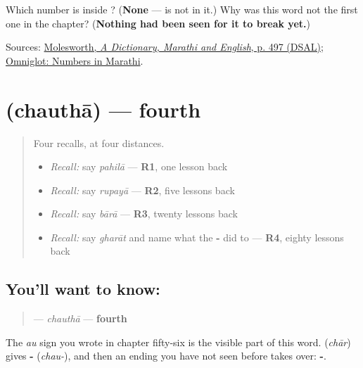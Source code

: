 \begin{tcolorbox}[breakable,colback=teal!4,colframe=teal!35!black,title={Before you move on}]
Which number is inside \textbf{}? (\textbf{None} — \textbf{} is not in it.) Why was this word not the first one in the chapter? (\textbf{Nothing had been seen for it to break yet.})

Sources: \href{https://dsal.uchicago.edu/cgi-bin/app/molesworth\_query.py?qs=\%E0\%A4\%AA\%E0\%A4\%B9\%E0\%A4\%BF\%E0\%A4\%B2\%E0\%A4\%BE\&searchhws=yes}{Molesworth, \emph{A Dictionary, Marathi and English}, p. 497 (DSAL)}; \href{https://www.omniglot.com/language/numbers/marathi.htm}{Omniglot: Numbers in Marathi}.
\end{tcolorbox}
\section[\texorpdfstring{\mr{चौथा} (chauthā)}{चौथा (chauthā)}]{ (chauthā) — fourth}

\label{lesson:MR-C60-chautha}



\begin{quote}
Four recalls, at four distances.

\begin{itemize}
\raggedright
  \item \emph{Recall:} say \emph{pahilā} — \textbf{R1}, one lesson back
  \item \emph{Recall:} say \emph{rupayā} — \textbf{R2}, five lessons back
  \item \emph{Recall:} say \emph{bārā} — \textbf{R3}, twenty lessons back
  \item \emph{Recall:} say \emph{gharāt} and name what the \textbf{-} did to \textbf{} — \textbf{R4}, eighty lessons back
\end{itemize}
\end{quote}

\subsection*{You'll want to know: }
\begin{quote}
\textbf{} — \emph{chauthā} — \textbf{fourth}
\end{quote}

The \emph{au} sign you wrote in chapter fifty-six is the visible part of this word. \textbf{} (\emph{chār}) gives \textbf{-} (\emph{chau-}), and then an ending you have not seen before takes over: \textbf{-}.

